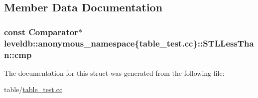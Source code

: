 \subsection{Member Data Documentation}
\hypertarget{structleveldb_1_1anonymous__namespace_02table__test_8cc_03_1_1_s_t_l_less_than_af5f2a142760435ea8f5064d3eca62424}{}
\subsubsection[{cmp}]{\setlength{\rightskip}{0pt plus 5cm}const {\bf Comparator}$\ast$ leveldb\+::anonymous\+\_\+namespace\{table\+\_\+test.\+cc\}\+::S\+T\+L\+Less\+Than\+::cmp}\label{structleveldb_1_1anonymous__namespace_02table__test_8cc_03_1_1_s_t_l_less_than_af5f2a142760435ea8f5064d3eca62424}


The documentation for this struct was generated from the following file\+:\begin{DoxyCompactItemize}
\item 
table/\hyperlink{table__test_8cc}{table\+\_\+test.\+cc}\end{DoxyCompactItemize}
